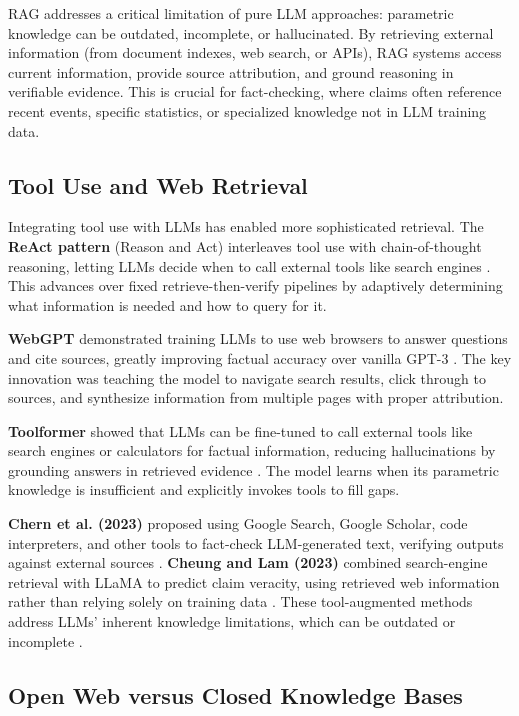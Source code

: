 \documentclass[12pt,a4paper]{article}
\begin{document}
RAG addresses a critical limitation of pure LLM approaches: parametric knowledge can be outdated, incomplete, or hallucinated. By retrieving external information (from document indexes, web search, or APIs), RAG systems access current information, provide source attribution, and ground reasoning in verifiable evidence. This is crucial for fact-checking, where claims often reference recent events, specific statistics, or specialized knowledge not in LLM training data.

\subsection{Tool Use and Web Retrieval}

Integrating tool use with LLMs has enabled more sophisticated retrieval. The \textbf{ReAct pattern} (Reason and Act) interleaves tool use with chain-of-thought reasoning, letting LLMs decide when to call external tools like search engines \citep{yao2023react}. This advances over fixed retrieve-then-verify pipelines by adaptively determining what information is needed and how to query for it.

\textbf{WebGPT} demonstrated training LLMs to use web browsers to answer questions and cite sources, greatly improving factual accuracy over vanilla GPT-3 \citep{nakano2022webgpt}. The key innovation was teaching the model to navigate search results, click through to sources, and synthesize information from multiple pages with proper attribution.

\textbf{Toolformer} showed that LLMs can be fine-tuned to call external tools like search engines or calculators for factual information, reducing hallucinations by grounding answers in retrieved evidence \citep{schick2023toolformer}. The model learns when its parametric knowledge is insufficient and explicitly invokes tools to fill gaps.

\textbf{Chern et al. (2023)} proposed using Google Search, Google Scholar, code interpreters, and other tools to fact-check LLM-generated text, verifying outputs against external sources \citep{chern2023framework}. \textbf{Cheung and Lam (2023)} combined search-engine retrieval with LLaMA to predict claim veracity, using retrieved web information rather than relying solely on training data \citep{cheung2023llmfactcheck}. These tool-augmented methods address LLMs' inherent knowledge limitations, which can be outdated or incomplete \citep{chern2023framework}.

\subsection{Open Web versus Closed Knowledge Bases}
\end{document}
